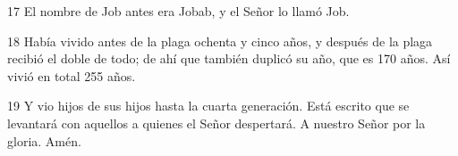 \par 17 El nombre de Job antes era Jobab, y el Señor lo llamó Job.

\par 18 Había vivido antes de la plaga ochenta y cinco años, y después de la plaga recibió el doble de todo; de ahí que también duplicó su año, que es 170 años. Así vivió en total 255 años.

\par 19 Y vio hijos de sus hijos hasta la cuarta generación. Está escrito que se levantará con aquellos a quienes el Señor despertará. A nuestro Señor por la gloria. Amén.


